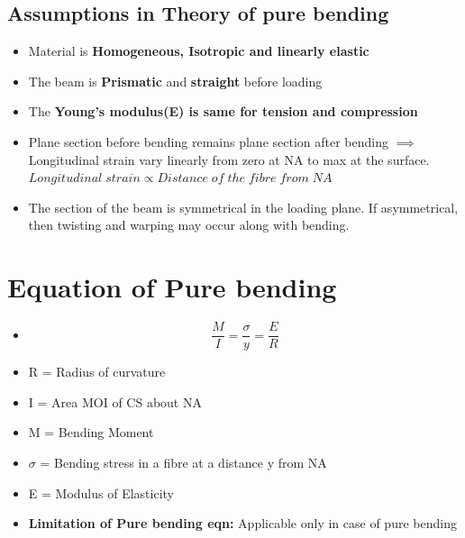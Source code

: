 \documentclass[8pt]{report}
\begin{document}
		\subsection{Assumptions in Theory of pure bending}
			\begin{itemize}
				\item Material is \textbf{Homogeneous, Isotropic and linearly elastic}
				\item The beam is \textbf{Prismatic} and \textbf{straight} before loading
				\item The \textbf{Young's modulus(E) is same for tension and compression}
				\item Plane section before bending remains plane section after bending $\implies$ Longitudinal strain vary linearly from zero at NA to max at the surface. $\boxed{Longitudinal\;strain\propto Distance\;of\;the\;fibre\;from\;NA}$
				\item The section of the beam is symmetrical in the loading plane. If asymmetrical, then twisting and warping may occur along with bending. 
			\end{itemize}\hrulefill
	\section{Equation of Pure bending}
		\begin{itemize}
			\item[] $$\boxed{\dfrac{M}{I} = \dfrac{\sigma}{y} = \dfrac{E}{R}}$$
			\item R = Radius of curvature
			\item I = Area MOI of CS about NA 
			\item M = Bending Moment
			\item $\sigma$ = Bending stress in a fibre at a distance y from NA
			\item E = Modulus of Elasticity
			\item \textbf{Limitation of Pure bending eqn: }Applicable only in case of pure bending
		\end{itemize}\hrulefill
\end{document}
